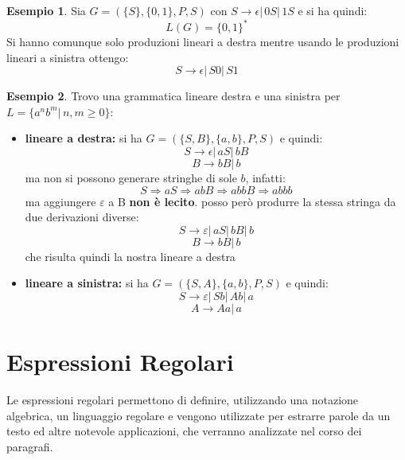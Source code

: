 \documentclass[a4paper]{book}
\theoremstyle{definition}%
\newtheorem*{esempio}{Esempio}
\begin{document}
\begin{esempio}
Sia $G=(\{S\},\{0,1\},P,S)$ con $S\to \epsilon|\,0S|\,1S$ e si ha quindi:
\[ L(G)=\{0,1\}^* \]
Si hanno comunque solo produzioni lineari a destra mentre usando le produzioni lineari a sinistra ottengo:
\[ S\to \epsilon|\, S0|\,S1 \]
\end{esempio}
\begin{esempio}
Trovo una grammatica lineare destra e una sinistra per $L=\{a^nb^m|\,n,m\geq 0\}$:
\begin{itemize}
\item \textbf{lineare a destra:} si ha $G=(\{S,B\},\{a,b\},P,S)$ e quindi:
\[ S\to \epsilon|\,aS|\,bB \]
\[ B\to bB|\,b \]
ma non si possono generare stringhe di sole $b$, infatti:
\[ S\Rightarrow aS\Rightarrow abB\Rightarrow abbB\Rightarrow abbb \]
ma aggiungere $\varepsilon$ a B \textbf{non è lecito}. posso però produrre la stessa stringa da due derivazioni diverse:
\[ S\to \varepsilon|\,aS|\,bB|\,b \]
\[ B\to bB|\,b \]
che risulta quindi la nostra lineare a destra
\item \textbf{lineare a sinistra:} si ha $G=(\{S,A\},\{a,b\},P,S)$ e quindi:
\[S\to \varepsilon|\,Sb|\,Ab|\,a \]
\[ A\to Aa|\,a \]
\end{itemize}
\end{esempio}

\section{Espressioni Regolari}
Le espressioni regolari permettono di definire, utilizzando una notazione algebrica, un linguaggio regolare e vengono utilizzate
per estrarre parole da un testo ed altre notevole applicazioni, che verranno analizzate nel corso dei paragrafi.
\end{document}
